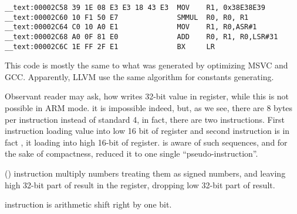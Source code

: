 \begin{lstlisting}
__text:00002C58 39 1E 08 E3 E3 18 43 E3  MOV    R1, 0x38E38E39
__text:00002C60 10 F1 50 E7              SMMUL  R0, R0, R1
__text:00002C64 C0 10 A0 E1              MOV    R1, R0,ASR#1
__text:00002C68 A0 0F 81 E0              ADD    R0, R1, R0,LSR#31
__text:00002C6C 1E FF 2F E1              BX     LR
\end{lstlisting}

{This code is mostly the same to what was generated by optimizing MSVC and GCC.}
{Apparently, LLVM use the same algorithm for constants generating.}

{Observant reader may ask, how \MOV writes 32-bit value in register, while this is not possible in ARM mode.}
{it is impossible indeed, but, as we see,
there are 8 bytes per instruction instead of standard 4,
in fact, there are two instructions.}
{First instruction loading  value into low 16 bit of register and second instruction is in fact
, it loading  into high 16-bit of register.}
\IDA {}
{is aware of such sequences, and for the sake of compactness, reduced it to one single ``pseudo-instruction''.}

 () 
{instruction multiply numbers treating them as signed numbers,
and leaving high 32-bit part of result in the  register,
dropping low 32-bit part of result.}

 
{instruction is arithmetic shift right by one bit.}

